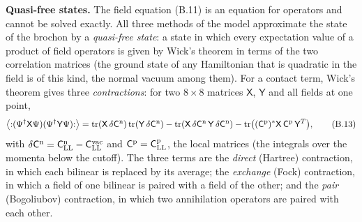 \documentclass[
  10pt,
]{article}
\begin{document}
\textbf{Quasi-free states.} The field equation (B.11) is an equation for
operators and cannot be solved exactly. All three methods of the model
approximate the state of the brochon by a \emph{quasi-free state}: a
state in which every expectation value of a product of field operators
is given by Wick's theorem in terms of the two correlation matrices (the
ground state of any Hamiltonian that is quadratic in the field is of
this kind, the normal vacuum among them). For a contact term, Wick's
theorem gives three \emph{contractions}: for two \(8\times8\) matrices
\(\mathsf X\), \(\mathsf Y\) and all fields at one point,
\[\big\langle{:}(\Psi^\dagger\mathsf X\Psi)(\Psi^\dagger\mathsf Y\Psi){:}\big\rangle=\mathrm{tr}(\mathsf X\,\delta\mathsf C^{\rm n})\,\mathrm{tr}(\mathsf Y\,\delta\mathsf C^{\rm n})-\mathrm{tr}(\mathsf X\,\delta\mathsf C^{\rm n}\,\mathsf Y\,\delta\mathsf C^{\rm n})-\mathrm{tr}\big((\mathsf C^{\rm p})^*\mathsf X\,\mathsf C^{\rm p}\,\mathsf Y^T\big),\tag{B.13}\]
with
\(\delta\mathsf C^{\rm n}=\mathsf C^{\rm n}_{\rm LL}-\mathsf C^{\rm vac}_{\rm LL}\)
and \(\mathsf C^{\rm p}=\mathsf C^{\rm p}_{\rm LL}\), the local matrices
(the integrals over the momenta below the cutoff). The three terms are
the \emph{direct} (Hartree) contraction, in which each bilinear is
replaced by its average; the \emph{exchange} (Fock) contraction, in
which a field of one bilinear is paired with a field of the other; and
the \emph{pair} (Bogoliubov) contraction, in which two annihilation
operators are paired with each other.
\end{document}
